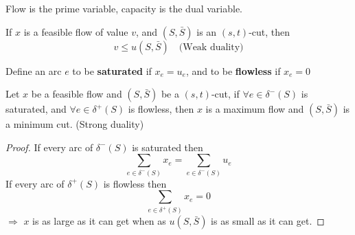             Flow is the prime variable, capacity is the dual variable.

            \begin{corollary}
                If $x$ is a feasible flow of value $v$, and $(S, \bar{S})$ is an $(s, t)$-cut, then
                \begin{equation*}
                    v \le u(S, \bar{S}) \quad \text{(Weak duality)}
                \end{equation*}
            \end{corollary}

            \begin{definition}
                Define an arc $e$ to be \textbf{saturated} if $x_e = u_e$, and to be \textbf{flowless} if $x_e = 0$
            \end{definition}

            \begin{corollary}
                Let $x$ be a feasible flow and $(S, \bar{S})$ be a $(s, t)$-cut, if $\forall e\in \delta^-(S)$ is saturated, and $\forall e\in \delta^+(S)$ is flowless, then $x$ is a maximum flow and $(S, \bar{S})$ is a minimum cut. (Strong duality)
            \end{corollary}

            \begin{proof}
                If every arc of $\delta^-(S)$ is saturated then
                \begin{equation*}
                    \sum_{e\in \delta^-(S)}x_e = \sum_{e\in \delta^-(S)}u_e
                \end{equation*}
                If every arc of $\delta^+(S)$ is flowless then
                \begin{equation*}
                    \sum_{e\in \delta^+(S)}x_e = 0
                \end{equation*}
                $\Rightarrow$ $x$ is as large as it can get when as $u(S, \bar{S})$ is as small as it can get.
            \end{proof}

